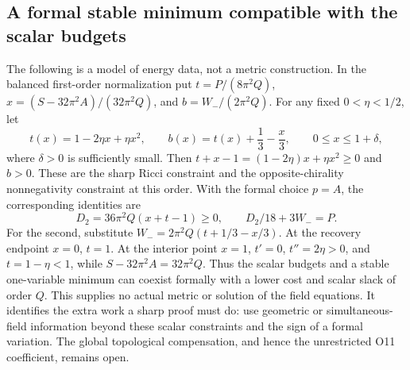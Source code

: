 \subsection{A formal stable minimum compatible with the scalar budgets}

The following is a model of energy data, not a metric construction.
In the balanced first-order normalization put
$t=P/(8\pi^2Q)$,
$x=(S-32\pi^2A)/(32\pi^2Q)$, and $b=W_-/(2\pi^2Q)$.
For any fixed $0<\eta<1/2$, let
\[
 t(x)=1-2\eta x+\eta x^2,\qquad
 b(x)=t(x)+\frac13-\frac x3,\qquad 0\le x\le1+\delta,
\]
where $\delta>0$ is sufficiently small.  Then
$t+x-1=(1-2\eta)x+\eta x^2\ge0$ and $b>0$.
These are the sharp Ricci constraint and the opposite-chirality
nonnegativity constraint at this order.  With the formal choice $p=A$,
the corresponding identities are
\begin{equation}\label{webvar:formal-stable-budget}
 D_2=36\pi^2Q(x+t-1)\ge0,\qquad D_2/18+3W_-=P.
\end{equation}
For the second, substitute
$W_-=2\pi^2Q(t+1/3-x/3)$.
At the recovery endpoint $x=0$, $t=1$.
At the interior point $x=1$,
$t'=0$, $t''=2\eta>0$, and $t=1-\eta<1$, while
$S-32\pi^2A=32\pi^2Q$.
Thus the scalar budgets and a stable one-variable minimum can
coexist formally with a lower cost and scalar slack of order $Q$.
This supplies no actual metric or solution of the field equations.
It identifies the extra work a sharp proof must do: use geometric
or simultaneous-field information beyond these scalar constraints
and the sign of a formal variation.  The global topological
compensation, and hence the unrestricted O11 coefficient, remains open.
